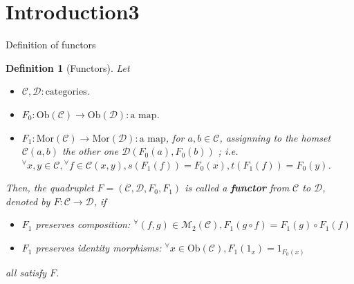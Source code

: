 \documentclass[dvipdfmx,10pt,notheorems]{beamer}
\newtheorem{definition}[theorem]{Definition}
\renewcommand{\#}{^\sharp}
\begin{document}
\section{Introduction3}
	\begin{frame}{Definition of functors}
			\begin{definition}[Functors]
					Let 
							\begin{itemize}
									\item $\mathcal{C},\mathcal{D}:\mbox{categories}$.
									\item $F_0: \mathrm{Ob}(\mathcal{C})\rightarrow \mathrm{Ob}(\mathcal{D}):
									\mbox{a map}$.
									\item $F_1: \mathrm{Mor}(\mathcal{C})\rightarrow \mathrm{Mor}(\mathcal{D}):
									\mbox{a map}$,  for $ a,b\in \mathcal{C}$, assignning to the
									 homset $\mathcal{C}(a,b)$ the other one
									 $\mathcal{D}(F_0(a),F_0(b))$ ; i.e.
									${}^\forall x,y\in\mathcal{C}, {}^\forall f\in\mathcal{C}(x,y), s(F_1(f))=F_0(x), t(F_1(f))=F_0(y)$.

							\end{itemize}
					Then,
					the quadruplet $F=(\mathcal{C},\mathcal{D},F_0,F_1)$
					is called a {\bf functor} from $\mathcal{C}$ to $\mathcal{D}$, denoted by $F:\mathcal{C}\rightarrow\mathcal{D}$, if
							\begin{itemize}
									\item $F_1$ preserves composition:
									$^\forall (f,g)\in\mathcal{M}_2(\mathcal{C}), F_1(g\circ f)=F_1(g)\circ F_1(f)$
									\item  $F_1$ preserves identity morphisms:
									$^\forall x\in\mathrm{Ob}(\mathcal{C}), F_1(1_x)=1_{F_0(x)}$
							\end{itemize}
					all satisfy $F$.
					
			\end{definition}
	\end{frame}
	
	
	
\end{document}
